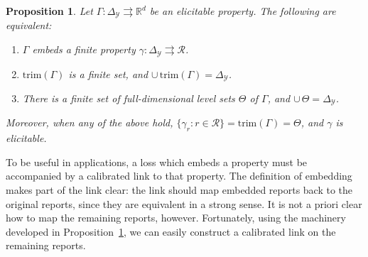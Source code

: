 \documentclass[12pt]{article}
\newcommand{\reals}{\mathbb{R}}
\newcommand{\simplex}{\Delta_\Y}
\newcommand{\R}{\mathcal{R}}
\newcommand{\Y}{\mathcal{Y}}
\newcommand{\toto}{\rightrightarrows}
\newcommand{\trim}{\mathrm{trim}}
\newtheorem{proposition}{Proposition}
\begin{document}
\begin{proposition}\label{prop:embed-trim}
  Let $\Gamma:\simplex\toto\reals^d$ be an elicitable property.
  The following are equivalent:
  \begin{enumerate}\setlength{\itemsep}{0pt}
  \item $\Gamma$ embeds a finite property $\gamma:\simplex \toto \R$.
  \item $\trim(\Gamma)$ is a finite set, and $\cup\,\trim(\Gamma) = \simplex$.
  \item There is a finite set of full-dimensional level sets $\Theta$ of $\Gamma$, and $\cup\,\Theta = \simplex$.
  \end{enumerate}
  Moreover, when any of the above hold, $\{\gamma_r : r\in\R\} = \trim(\Gamma) = \Theta$, and $\gamma$ is elicitable.
\end{proposition}


To be useful in applications, a loss which embeds a property must be accompanied by a calibrated link to that property.
The definition of embedding makes part of the link clear: the link should map embedded reports back to the original reports, since they are equivalent in a strong sense.
It is not a priori clear how to map the remaining reports, however.
Fortunately, using the machinery developed in Proposition~\ref{prop:embed-trim}, we can easily construct a calibrated link on the remaining reports.
\end{document}
